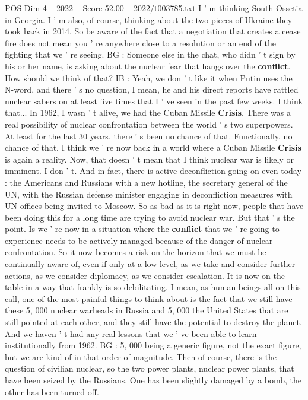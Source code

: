 \begin{textsample}{POS Dim 4 – 2022 – Score 52.00 – 2022/t003785.txt}
I ' m thinking South Ossetia in Georgia.
I ' m also, of course, thinking about the two pieces of Ukraine they took back in 2014.
So be aware of the fact that a negotiation that creates a cease fire does not mean you ' re anywhere close to a resolution or an end of the fighting that we ' re seeing.
BG : Someone else in the chat, who didn ' t sign by his or her name, is asking about the nuclear fear that hangs over the \textbf{conflict}.
How should we think of that?
IB : Yeah, we don ' t like it when Putin uses the N-word, and there ' s no question, I mean, he and his direct reports have rattled nuclear sabers on at least five times that I ' ve seen in the past few weeks.
I think that...
In 1962, I wasn ' t alive, we had the Cuban Missile \textbf{Crisis}.
There was a real possibility of nuclear confrontation between the world ' s two superpowers.
At least for the last 30 years, there ' s been no chance of that.
Functionally, no chance of that.
I think we ' re now back in a world where a Cuban Missile \textbf{Crisis} is again a reality.
Now, that doesn ' t mean that I think nuclear war is likely or imminent.
I don ' t.
And in fact, there is active deconfliction going on even today : the Americans and Russians with a new hotline, the secretary general of the UN, with the Russian defense minister engaging in deconfliction measures with UN offices being invited to Moscow.
So as bad as it is right now, people that have been doing this for a long time are trying to avoid nuclear war.
But that ' s the point.
Is we ' re now in a situation where the \textbf{conflict} that we ' re going to experience needs to be actively managed because of the danger of nuclear confrontation.
So it now becomes a risk on the horizon that we must be continually aware of, even if only at a low level, as we take and consider further actions, as we consider diplomacy, as we consider escalation.
It is now on the table in a way that frankly is so debilitating.
I mean, as human beings all on this call, one of the most painful things to think about is the fact that we still have these 5, 000 nuclear warheads in Russia and 5, 000 the United States that are still pointed at each other, and they still have the potential to destroy the planet.
And we haven ' t had any real lessons that we ' ve been able to learn institutionally from 1962.
BG : 5, 000 being a generic figure, not the exact figure, but we are kind of in that order of magnitude.
Then of course, there is the question of civilian nuclear, so the two power plants, nuclear power plants, that have been seized by the Russians.
One has been slightly damaged by a bomb, the other has been turned off.

\end{textsample}
